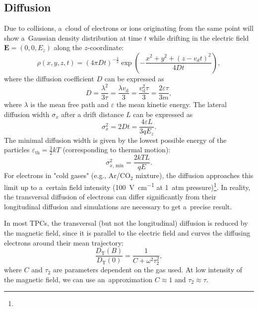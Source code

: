 		\subsection{Diffusion}
			Due to collisions, a~cloud of electrons or ions originating from the same point will show a~Gaussian density distribution at time $t$ while drifting in the electric field $\mathbf{E} = (0,0,E_z)$ along the $z$\nobreakdash-coordinate:
				\begin{equation}
					\rho(x,y,z,t) = (4\pi Dt)^{-\frac{3}{2}} \exp\left(-\frac{x^2+y^2+(z-v_dt)^2}{4Dt}\right),
				\end{equation}
			where the diffusion coefficient $D$ can be expressed as
				\begin{equation}
					D = \frac{\lambda^2}{3\tau} = \frac{\lambda v_\text{d}}{3} = \frac{v_\text{d}^2\tau}{3} = \frac{2\varepsilon\tau}{3m},
				\end{equation}
			where $\lambda$ is the mean free path and $\varepsilon$ the mean kinetic energy. The lateral diffusion width $\sigma_x$ after a drift distance $L$ can be expressed as
				\begin{equation}
					\sigma_x^2 = 2Dt = \frac{4\varepsilon L}{3qE_z}.
				\end{equation}
			The minimal diffusion width is given by the lowest possible energy of the particles $\varepsilon_\text{th} = \frac{3}{2}kT$ (corresponding to thermal motion):
				\begin{equation}
					\sigma_{x, \,\text{min}}^2 = \frac{2kTL}{qE}.
				\end{equation}
			For electrons in "cold gases" (e.g., Ar/CO$_2$ mixture), the diffusion approaches this limit up to a~certain field intensity (\textapprox\qty{100}{\V\per\cm} at 1~atm pressure)\footnote{}. In reality, the transversal diffusion of electrons can differ significantly from their longitudinal diffusion and simulations are necessary to get a~precise result.
			
			In most \acp{TPC}, the transversal (but not the longitudinal) diffusion is reduced by the magnetic field, since it is parallel to the electric field and curves the diffusing electrons around their mean trajectory:
				\begin{equation}
					\label{eq:difmag}
					\frac{D_\text{T}(B)}{D_\text{T}(0)} = \frac{1}{C+\omega^2\tau_2^2},
				\end{equation}
			where $C$ and $\tau_2$ are parameters dependent on the gas used. At low intensity of the magnetic field, we can use an~approximation $C\approx1$ and $\tau_2\approx\tau$.
			
